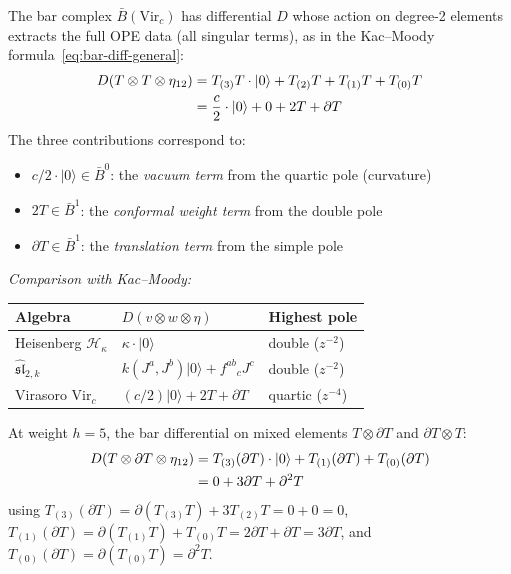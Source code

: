 \begin{computation}\label{comp:virasoro-bar-diff}
The bar complex $\bar{B}(\mathrm{Vir}_c)$ has differential $D$ whose action on degree-2 elements extracts the full OPE data (all singular terms), as in the Kac--Moody formula~\eqref{eq:bar-diff-general}:
\begin{align}
D(T \otimes T \otimes \eta_{12}) &= T_{(3)}T \cdot |0\rangle + T_{(2)}T + T_{(1)}T + T_{(0)}T \notag \\
&= \frac{c}{2}\cdot|0\rangle + 0 + 2T + \partial T \label{eq:vir-bar-diff-TT}
\end{align}
The three contributions correspond to:
\begin{itemize}
\item $c/2\cdot|0\rangle \in \bar{B}^0$: the \emph{vacuum term} from the quartic pole (curvature)
\item $2T \in \bar{B}^1$: the \emph{conformal weight term} from the double pole
\item $\partial T \in \bar{B}^1$: the \emph{translation term} from the simple pole
\end{itemize}

\emph{Comparison with Kac--Moody:}
\begin{center}
\begin{tabular}{lll}
\textbf{Algebra} & \textbf{$D(v \otimes w \otimes \eta)$} & \textbf{Highest pole} \\
\hline
Heisenberg $\mathcal{H}_\kappa$ & $\kappa\cdot|0\rangle$ & double ($z^{-2}$) \\
$\widehat{\mathfrak{sl}}_{2,k}$ & $k(J^a,J^b)|0\rangle + f^{ab}{}_c J^c$ & double ($z^{-2}$) \\
Virasoro $\mathrm{Vir}_c$ & $(c/2)|0\rangle + 2T + \partial T$ & quartic ($z^{-4}$)
\end{tabular}
\end{center}

At weight $h = 5$, the bar differential on mixed elements $T \otimes \partial T$ and $\partial T \otimes T$:
\begin{align}
D(T \otimes \partial T \otimes \eta_{12}) &= T_{(3)}(\partial T) \cdot |0\rangle + T_{(1)}(\partial T) + T_{(0)}(\partial T) \notag \\
&= 0 + 3\partial T + \partial^2 T \label{eq:vir-bar-TdT}
\end{align}
using $T_{(3)}(\partial T) = \partial(T_{(3)}T) + 3 T_{(2)}T = 0 + 0 = 0$, $T_{(1)}(\partial T) = \partial(T_{(1)}T) + T_{(0)}T = 2\partial T + \partial T = 3\partial T$, and $T_{(0)}(\partial T) = \partial(T_{(0)}T) = \partial^2 T$.
\end{computation}

